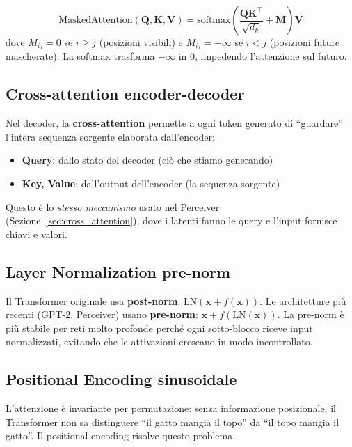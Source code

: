 \documentclass[12pt,a4paper]{article}
\begin{document}
\begin{formulabox}
\[
    \text{MaskedAttention}(\mathbf{Q}, \mathbf{K}, \mathbf{V}) = \text{softmax}\!\left(\frac{\mathbf{Q}\mathbf{K}^\top}{\sqrt{d_k}} + \mathbf{M}\right) \mathbf{V}
\]
dove $M_{ij} = 0$ se $i \geq j$ (posizioni visibili) e $M_{ij} = -\infty$ se $i < j$ (posizioni future mascherate). La softmax trasforma $-\infty$ in 0, impedendo l'attenzione sul futuro.
\end{formulabox}


\subsection{Cross-attention encoder-decoder}

Nel decoder, la \textbf{cross-attention} permette a ogni token generato di ``guardare'' l'intera sequenza sorgente elaborata dall'encoder:
\begin{itemize}
    \item \textbf{Query}: dallo stato del decoder (ci\`o che stiamo generando)
    \item \textbf{Key, Value}: dall'output dell'encoder (la sequenza sorgente)
\end{itemize}

Questo \`e lo \emph{stesso meccanismo} usato nel Perceiver (Sezione~\ref{sec:cross_attention}), dove i latenti fanno le query e l'input fornisce chiavi e valori.


\subsection{Layer Normalization pre-norm}

Il Transformer originale usa \textbf{post-norm}: $\text{LN}(\mathbf{x} + f(\mathbf{x}))$. Le architetture pi\`u recenti (GPT-2, Perceiver) usano \textbf{pre-norm}: $\mathbf{x} + f(\text{LN}(\mathbf{x}))$. La pre-norm \`e pi\`u stabile per reti molto profonde perch\'e ogni sotto-blocco riceve input normalizzati, evitando che le attivazioni crescano in modo incontrollato.


\subsection{Positional Encoding sinusoidale}

L'attenzione \`e invariante per permutazione: senza informazione posizionale, il Transformer non sa distinguere ``il gatto mangia il topo'' da ``il topo mangia il gatto''. Il positional encoding risolve questo problema.
\end{document}
